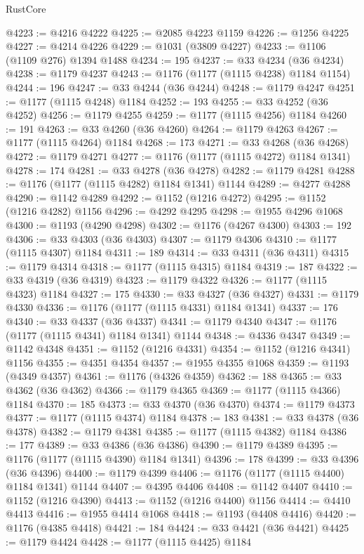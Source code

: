 \begin{lexlean}{RustCore}
\begin{coremodule}
@4223 := @4216 @4222
@4225 := @2085 @4223 @1159
@4226 := @1256 @4225
@4227 := @4214 @4226
@4229 := @1031 (@3809 @4227)
@4233 := @1106 (@1109 @276) @1394 @1488
@4234 := 195
@4237 := @33 @4234 (@36 @4234)
@4238 := @1179 @4237
@4243 := @1176 (@1177 (@1115 @4238) @1184 @1154)
@4244 := 196
@4247 := @33 @4244 (@36 @4244)
@4248 := @1179 @4247
@4251 := @1177 (@1115 @4248) @1184
@4252 := 193
@4255 := @33 @4252 (@36 @4252)
@4256 := @1179 @4255
@4259 := @1177 (@1115 @4256) @1184
@4260 := 191
@4263 := @33 @4260 (@36 @4260)
@4264 := @1179 @4263
@4267 := @1177 (@1115 @4264) @1184
@4268 := 173
@4271 := @33 @4268 (@36 @4268)
@4272 := @1179 @4271
@4277 := @1176 (@1177 (@1115 @4272) @1184 @1341)
@4278 := 174
@4281 := @33 @4278 (@36 @4278)
@4282 := @1179 @4281
@4288 := @1176 (@1177 (@1115 @4282) @1184 @1341) @1144
@4289 := @4277 @4288
@4290 := @1142 @4289
@4292 := @1152 (@1216 @4272)
@4295 := @1152 (@1216 @4282) @1156
@4296 := @4292 @4295
@4298 := @1955 @4296 @1068
@4300 := @1193 (@4290 @4298)
@4302 := @1176 (@4267 @4300)
@4303 := 192
@4306 := @33 @4303 (@36 @4303)
@4307 := @1179 @4306
@4310 := @1177 (@1115 @4307) @1184
@4311 := 189
@4314 := @33 @4311 (@36 @4311)
@4315 := @1179 @4314
@4318 := @1177 (@1115 @4315) @1184
@4319 := 187
@4322 := @33 @4319 (@36 @4319)
@4323 := @1179 @4322
@4326 := @1177 (@1115 @4323) @1184
@4327 := 175
@4330 := @33 @4327 (@36 @4327)
@4331 := @1179 @4330
@4336 := @1176 (@1177 (@1115 @4331) @1184 @1341)
@4337 := 176
@4340 := @33 @4337 (@36 @4337)
@4341 := @1179 @4340
@4347 := @1176 (@1177 (@1115 @4341) @1184 @1341) @1144
@4348 := @4336 @4347
@4349 := @1142 @4348
@4351 := @1152 (@1216 @4331)
@4354 := @1152 (@1216 @4341) @1156
@4355 := @4351 @4354
@4357 := @1955 @4355 @1068
@4359 := @1193 (@4349 @4357)
@4361 := @1176 (@4326 @4359)
@4362 := 188
@4365 := @33 @4362 (@36 @4362)
@4366 := @1179 @4365
@4369 := @1177 (@1115 @4366) @1184
@4370 := 185
@4373 := @33 @4370 (@36 @4370)
@4374 := @1179 @4373
@4377 := @1177 (@1115 @4374) @1184
@4378 := 183
@4381 := @33 @4378 (@36 @4378)
@4382 := @1179 @4381
@4385 := @1177 (@1115 @4382) @1184
@4386 := 177
@4389 := @33 @4386 (@36 @4386)
@4390 := @1179 @4389
@4395 := @1176 (@1177 (@1115 @4390) @1184 @1341)
@4396 := 178
@4399 := @33 @4396 (@36 @4396)
@4400 := @1179 @4399
@4406 := @1176 (@1177 (@1115 @4400) @1184 @1341) @1144
@4407 := @4395 @4406
@4408 := @1142 @4407
@4410 := @1152 (@1216 @4390)
@4413 := @1152 (@1216 @4400) @1156
@4414 := @4410 @4413
@4416 := @1955 @4414 @1068
@4418 := @1193 (@4408 @4416)
@4420 := @1176 (@4385 @4418)
@4421 := 184
@4424 := @33 @4421 (@36 @4421)
@4425 := @1179 @4424
@4428 := @1177 (@1115 @4425) @1184

\end{coremodule}
\end{lexlean}
